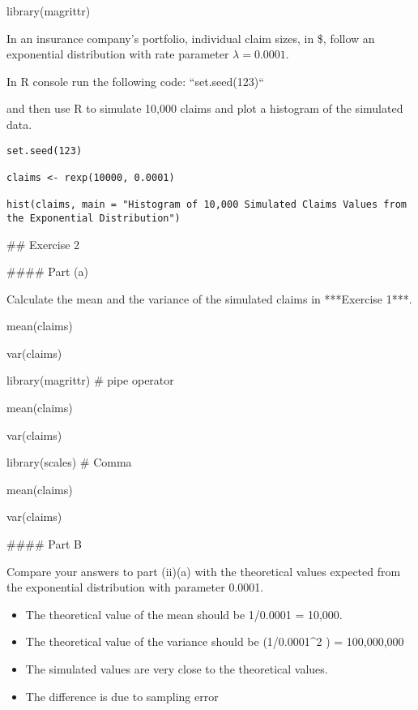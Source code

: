 \documentclass[a4paper,12pt]{article}
\begin{document}
library(magrittr)

In an insurance company’s portfolio, individual claim sizes, in \$, follow an exponential distribution with rate parameter $\lambda = 0.0001$.


In R console run the following code: ``set.seed(123)``

and then use R to simulate 10,000 claims and plot a histogram of the simulated data. 


\begin{verbatim}
set.seed(123)

claims <- rexp(10000, 0.0001)

hist(claims, main = "Histogram of 10,000 Simulated Claims Values from the Exponential Distribution")

\end{verbatim}


## Exercise 2

#### Part (a)

Calculate the mean and the variance of the simulated claims in ***Exercise 1***.


mean(claims)

var(claims)


library(magrittr)  # pipe operator %

mean(claims) %

var(claims)   %

library(scales)    # Comma



mean(claims) %

var(claims)  %


#### Part B

Compare your answers to part (ii)(a) with the theoretical values expected from the exponential distribution with parameter 0.0001.


\begin{itemize}
    \item The theoretical value of the mean should be 1/0.0001 = 10,000.

    \item The theoretical value of the variance should be (1/0.0001^2 ) = 100,000,000 

    \item The simulated values are very close to the theoretical values. 

    \item The difference is due to sampling error 
\end{itemize}
\end{document}

